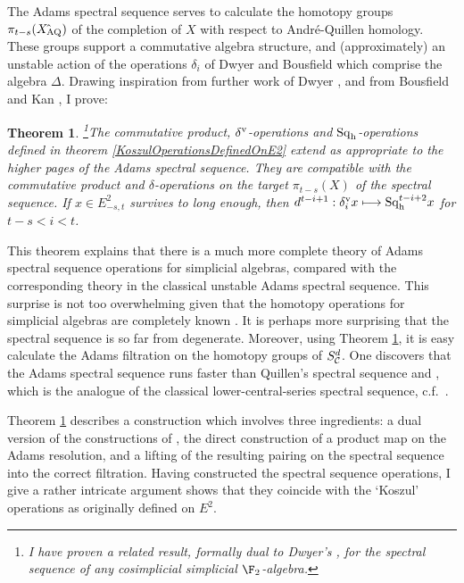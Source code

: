 \documentclass[11pt]{article}
\theoremstyle{plain}
\newtheorem{theorem}{Theorem}
\newcommand{\Sq}{\mathrm{Sq}}
\begin{document}
The Adams spectral sequence serves to calculate the homotopy groups $\pi_{t-s}(X{\hat{\,}_\textup{\!\!AQ}})$ of the  completion of $X$ with respect to Andr\'e-Quillen homology. These groups support a commutative algebra structure, and (approximately) an unstable action of the operations $\delta_i$ of Dwyer and Bousfield \cite{DwyerHtpyOpsSimpComAlg.pdf, BousOpnsDerFun.pdf} which comprise the algebra $\Delta$. Drawing inspiration from further work of Dwyer \cite{DwyerHigherDividedSquares.pdf}, and from Bousfield and Kan \cite{BK_pairings_products.pdf}, I prove:
\begin{theorem}\textbf{}\!\!\!\textbf{}%
\footnote{I have proven a related result, formally dual to Dwyer's \cite{DwyerHigherDividedSquares.pdf}, for the spectral sequence of any cosimplicial simplicial $\F_2$-algebra.}\label{AdamsOpsExtend}
The commutative product, $\delta^\textup{v}$-operations and $\Sq_\textup{h}$-operations defined in theorem \ref{KoszulOperationsDefinedOnE2} extend as appropriate to the higher pages of the Adams spectral sequence. They are compatible with the commutative product and $\delta$-operations on the target $\pi_{t-s}(X)$ of the spectral sequence. If $x\in E^2_{-s,t}$ survives to long enough, then
$d^{t-i+1}:\delta_i^\textup{v}x\mapsto \Sq_\textup{h}^{t-i+2}x$ for $t-s<i<t$.
\end{theorem}
\noindent This theorem explains that there is a much more complete theory of Adams spectral sequence operations for simplicial algebras, compared with the corresponding theory in the classical unstable Adams spectral sequence. This surprise is not too overwhelming given that the homotopy operations for simplicial algebras are completely known \cite{DwyerHtpyOpsSimpComAlg.pdf}. It is perhaps more surprising that the spectral sequence is so far from degenerate. Moreover, using Theorem \ref{AdamsOpsExtend}, it is easy calculate the Adams filtration on the homotopy groups of $S^d_{\mathcal{C}}$. One discovers that the Adams spectral sequence runs faster than Quillen's spectral sequence \cite[\S6]{MR1089001} and \cite[\S6]{quillenCohCommRings.pdf}, which is the analogue of the classical lower-central-series spectral sequence, c.f.\ \cite{Curtis_LCS.pdf,Rector_UnstAdams.pdf}.%


Theorem \ref{AdamsOpsExtend} describes a construction which involves three ingredients: a dual version of the constructions of \cite{DwyerHigherDividedSquares.pdf}, the direct construction of a product map on the Adams resolution, and a lifting of the resulting pairing on the spectral sequence into the correct filtration. Having constructed the spectral sequence operations, I give a rather intricate argument shows that they coincide with the `Koszul' operations as originally defined on $E^2$.
\end{document}
